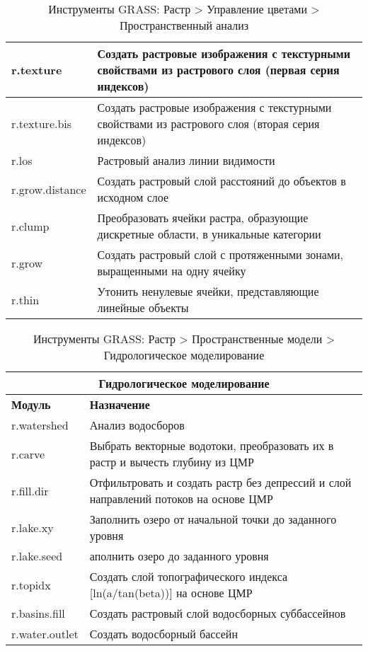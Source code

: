 {\begin{table}[H]
\begin{tabular}{|p{4cm}|p{10cm}|}
  \hline r.texture & Создать растровые изображения с текстурными
  свойствами из растрового слоя (первая серия индексов) \\
  \hline r.texture.bis & Создать растровые изображения с текстурными
  свойствами из растрового слоя (вторая серия индексов) \\
  \hline r.los & Растровый анализ линии видимости \\
  \hline r.grow.distance & Создать растровый слой расстояний до объектов
  в исходном слое \\
  \hline r.clump & Преобразовать ячейки растра, образующие дискретные
  области, в уникальные категории \\
  \hline r.grow & Создать растровый слой с протяженными зонами,
  выращенными на одну ячейку \\
  \hline r.thin & Утонить ненулевые ячейки, представляющие линейные
  объекты \\
\hline
\end{tabular}
\caption{Инструменты GRASS: Растр > Управление цветами > Пространственный анализ}
\end{table}}

{\renewcommand{\arraystretch}{0.7}
\begin{table}[H]
\centering
 \begin{tabular}{|p{4cm}|p{10cm}|}
  \hline \multicolumn{2}{|c|}{\textbf{Гидрологическое моделирование}} \\
  \hline \textbf{Модуль} & \textbf{Назначение} \\
  \hline r.watershed & Анализ водосборов \\
  \hline r.carve & Выбрать векторные водотоки, преобразовать их в растр
  и вычесть глубину из ЦМР \\
  \hline r.fill.dir & Отфильтровать и создать растр без депрессий и слой
  направлений потоков на основе ЦМР \\
  \hline r.lake.xy & Заполнить озеро от начальной точки до заданного
  уровня \\
  \hline r.lake.seed & аполнить озеро до заданного уровня \\
  \hline r.topidx & Создать слой топографического индекса [ln(a/tan(beta))]
  на основе ЦМР \\
  \hline r.basins.fill & Создать растровый слой водосборных суббассейнов \\
  \hline r.water.outlet & Создать водосборный бассейн \\
\hline
\end{tabular}
\caption{Инструменты GRASS: Растр > Пространственные модели > Гидрологическое моделирование}
\end{table}}

